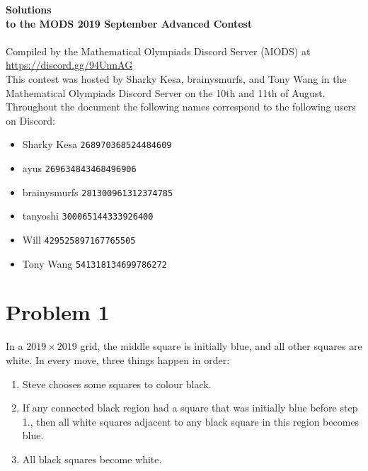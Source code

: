 \documentclass[10pt]{article}
\begin{document}
		\setcounter{section}{0}
		\noindent \huge\textbf{Solutions}\vspace{2pt}\\
		\noindent \large\textbf{to the MODS 2019 September Advanced Contest} \vspace{3pt}\\
		\noindent \makebox[\linewidth]{\rule{\textwidth}{0.4pt}}\\
	
		\noindent \normalsize Compiled by the Mathematical Olympiads Discord Server (MODS) at \url{https://discord.gg/94UnnAG}\\
		
		\noindent This contest was hosted by Sharky Kesa, brainysmurfs, and Tony Wang in the Mathematical Olympiads Discord Server on the 10th and 11th of August. Throughout the document the following names correspond to the following users on Discord:
		\begin{itemize}[noitemsep]
		\item Sharky Kesa \tabto*{100pt}\texttt{268970368524484609}
		\item ayus \tabto*{100pt}\texttt{269634843468496906}
		\item brainysmurfs \tabto*{100pt}\texttt{281300961312374785}
		\item tanyoshi \tabto*{100pt}\texttt{300065144333926400}
		\item Will \tabto*{100pt}\texttt{429525897167765505}
		\item Tony Wang \tabto*{100pt}\texttt{541318134699786272}
		\end{itemize}
		
		
	\newpage		
			
	\section*{Problem 1}
	
	In a $2019 \times 2019$ grid, the middle square is initially blue, and all other squares are white. In every move, three things happen in order:
	\begin{enumerate}
	\item Steve chooses some squares to colour black.
	\item If any connected black region had a square that was initially blue before step 1., then all white squares adjacent to any black square in this region becomes blue.
	\item All black squares become white.
	\end{enumerate}
	
\end{document}
